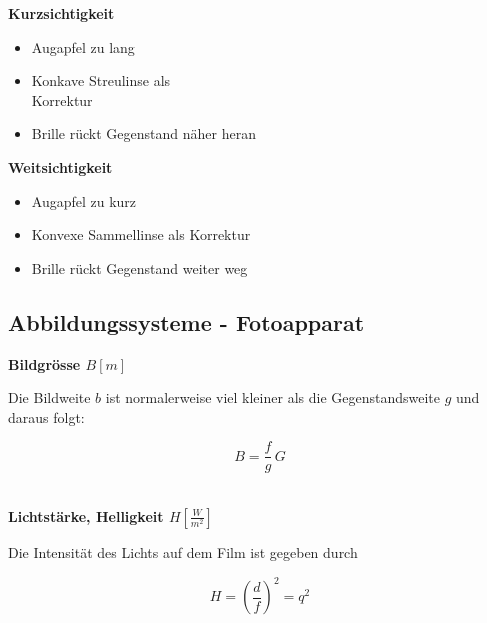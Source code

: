 \begin{minipage}{0.48\linewidth}
\textbf{Kurzsichtigkeit} 
\raggedright
\begin{itemize}

\item Augapfel zu lang
\item Konkave Streulinse als\\
	 Korrektur
\item Brille rückt Gegenstand näher heran 

\end{itemize}


\end{minipage}
\hfill
\begin{minipage}{0.48\linewidth}
\raggedright
\textbf{Weitsichtigkeit}
\begin{itemize}

\item Augapfel zu kurz
\item Konvexe Sammellinse als Korrektur
\item Brille rückt Gegenstand weiter weg 

\end{itemize}


\end{minipage}



\subsection{Abbildungssysteme - Fotoapparat}

\textbf{Bildgrösse $B [m]$} 

\begin{minipage}{0.48\linewidth}
Die Bildweite $b$ ist normalerweise viel kleiner als die
Gegenstandsweite $g$ und daraus folgt: \\
\end{minipage}
\hfill
\begin{minipage}{0.48\linewidth}
$$ \boxed{ B = \frac{f}{g} \, G }$$ \\
\end{minipage}


\textbf{Lichtstärke, Helligkeit $H [\frac{W}{m^2}]$} 

\begin{minipage}{0.48\linewidth}
Die Intensität des Lichts auf dem Film ist gegeben durch \\
\end{minipage}
\hfill
\begin{minipage}{0.48\linewidth}
$$ \boxed{ H = \left(  \frac{d}{f} \right)^2 = q^2 } $$ \\
\end{minipage}




